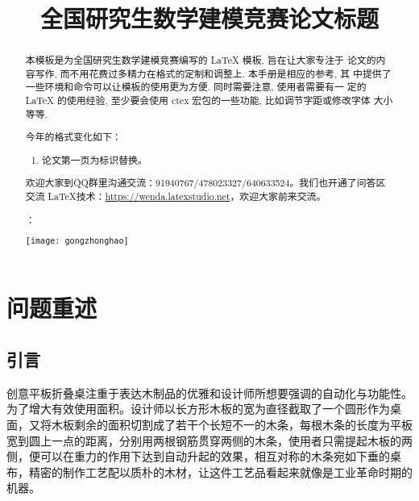\documentclass[bwprint]{gmcmthesis}
\title{全国研究生数学建模竞赛论文标题}
\begin{document}
 \maketitle

\begin{abstract}
本模板是为全国研究生数学建模竞赛编写的 \LaTeX{} 模板, 旨在让大家专注于
论文的内容写作, 而不用花费过多精力在格式的定制和调整上. 本手册是相应的参考, 其
中提供了一些环境和命令可以让模板的使用更为方便. 同时需要注意, 使用者需要有一
定的 \LaTeX{} 的使用经验, 至少要会使用 ctex 宏包的一些功能, 比如调节字距或修改字体
大小等等.


 \begin{mdframed} [%
	roundcorner=5pt,
	linecolor=gray!50,
	outerlinewidth=0.5pt,
	middlelinewidth=0.3pt, backgroundcolor=gray!2,
innertopmargin=\topskip, frametitle={2020年格式变化说明},
frametitlefont= \bfseries,frametitlerule=true,frametitlealignment =\raggedright\noindent,
frametitlerulewidth=.5pt, frametitlebackgroundcolor=gray!2,]
今年的格式变化如下：
\begin{enumerate}
\item 论文第一页为标识替换。

\end{enumerate}

\end{mdframed}



欢迎大家到QQ群里沟通交流：91940767/478023327/640633524。我们也开通了问答区交流 \LaTeX{}技术：\url{https://wenda.latexstudio.net}，欢迎大家前来交流。


：

\centerline{\texttt{[image: gongzhonghao]}}


\end{abstract}

\pagestyle{plain}


\section{问题重述}

\subsection{引言}

创意平板折叠桌注重于表达木制品的优雅和设计师所想要强调的自动化与功能性。为了增大有效使用面积。设计师以长方形木板的宽为直径截取了一个圆形作为桌面，又将木板剩余的面积切割成了若干个长短不一的木条，每根木条的长度为平板宽到圆上一点的距离，分别用两根钢筋贯穿两侧的木条，使用者只需提起木板的两侧，便可以在重力的作用下达到自动升起的效果，相互对称的木条宛如下垂的桌布，精密的制作工艺配以质朴的木材，让这件工艺品看起来就像是工业革命时期的机器。
\end{document}
